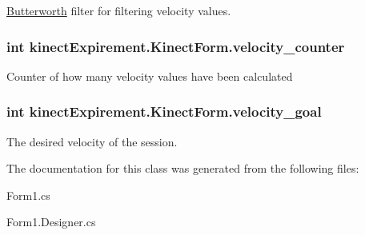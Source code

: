 \hyperlink{classkinect_expirement_1_1_butterworth}{Butterworth} filter for filtering velocity values. 

\subsubsection[{\texorpdfstring{velocity\+\_\+counter}{velocity_counter}}]{\setlength{\rightskip}{0pt plus 5cm}int kinect\+Expirement.\+Kinect\+Form.\+velocity\+\_\+counter}\hypertarget{classkinect_expirement_1_1_kinect_form_aedd93118198e798ee966ff768038bac1}{}\label{classkinect_expirement_1_1_kinect_form_aedd93118198e798ee966ff768038bac1}


Counter of how many velocity values have been calculated 

\subsubsection[{\texorpdfstring{velocity\+\_\+goal}{velocity_goal}}]{\setlength{\rightskip}{0pt plus 5cm}int kinect\+Expirement.\+Kinect\+Form.\+velocity\+\_\+goal}\hypertarget{classkinect_expirement_1_1_kinect_form_a6334825924ef2914544c0c96c0ad0572}{}\label{classkinect_expirement_1_1_kinect_form_a6334825924ef2914544c0c96c0ad0572}


The desired velocity of the session. 



The documentation for this class was generated from the following files\+:\begin{DoxyCompactItemize}
\item 
Form1.\+cs\item 
Form1.\+Designer.\+cs\end{DoxyCompactItemize}
